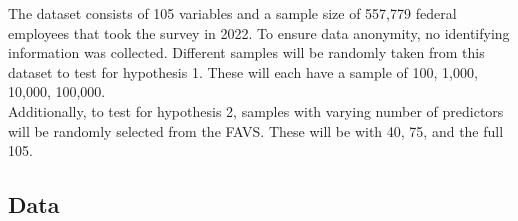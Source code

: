 \documentclass[
  man]{apa7}
\newenvironment{lltable}{\begin{landscape}\centering\begin{ThreePartTable}}{\end{ThreePartTable}\end{landscape}}
\begin{document}
The dataset consists of 105 variables and a sample size of 557,779 federal employees that took the survey in 2022. To ensure data anonymity, no identifying information was collected. Different samples will be randomly taken from this dataset to test for hypothesis 1. These will each have a sample of 100, 1,000, 10,000, 100,000.\\
Additionally, to test for hypothesis 2, samples with varying number of predictors will be randomly selected from the FAVS. These will be with 40, 75, and the full 105.

\hypertarget{data}{%
\subsection{Data}\label{data}}

\begin{lltable}

\tiny{

}
\end{lltable}
\end{document}
